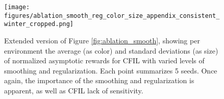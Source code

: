 \begin{figure}[h]
\vskip 0.1in
\centering
\texttt{[image: figures/ablation\_smooth\_reg\_color\_size\_appendix\_consistent\_winter\_cropped.png]} %
\caption{Extended version of Figure \ref{fig:ablation_smooth}, showing per environment the average (as color) and standard deviations (as size) of normalized asymptotic rewards for CFIL with
varied levels of smoothing and regularization. Each point summarizes 5 seeds. Once again, the importance of the smoothing and regularization is apparent, as well as CFIL lack of sensitivity.}
\label{fig:ablation_smooth_per_env}
\vskip -0.1in
\end{figure}